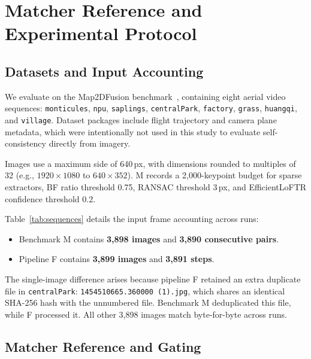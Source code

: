 \documentclass[conference]{IEEEtran}
\begin{document}
\section{Matcher Reference and Experimental Protocol}
\label{sec:protocol}

\subsection{Datasets and Input Accounting}
\label{subsec:datasets}

We evaluate on the Map2DFusion benchmark~\cite{map2dfusion}, containing eight aerial video sequences: \texttt{monticules}, \texttt{npu}, \texttt{saplings}, \texttt{centralPark}, \texttt{factory}, \texttt{grass}, \texttt{huangqi}, and \texttt{village}. Dataset packages include flight trajectory and camera plane metadata, which were intentionally not used in this study to evaluate self-consistency directly from imagery.

\begin{table}[h]
\centering
\caption{Dataset Accounting and Experimental Sequence Profiles}
\label{tab:sequences}
\footnotesize

\end{table}

Images use a maximum side of 640\,px, with dimensions rounded to multiples of 32 (e.g., $1920\times1080$ to $640\times352$). M records a 2,000-keypoint budget for sparse extractors, BF ratio threshold 0.75, RANSAC threshold 3\,px, and EfficientLoFTR confidence threshold 0.2.

Table~\ref{tab:sequences} details the input frame accounting across runs:
\begin{itemize}
    \item Benchmark M contains \textbf{3,898 images} and \textbf{3,890 consecutive pairs}.
    \item Pipeline F contains \textbf{3,899 images} and \textbf{3,891 steps}.
\end{itemize}
The single-image difference arises because pipeline F retained an extra duplicate file in \texttt{centralPark}: \nolinkurl{1454510665.360000 (1).jpg}, which shares an identical SHA-256 hash with the unnumbered file. Benchmark M deduplicated this file, while F processed it. All other 3,898 images match byte-for-byte across runs.

\subsection{Matcher Reference and Gating}
\label{subsec:ref_gating}
\end{document}
